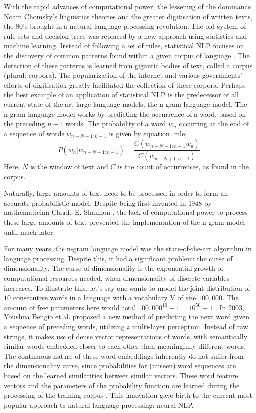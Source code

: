 \documentclass[twoside]{uva-inf-bachelor-thesis}
\begin{document}
With the rapid advances of computational power, the lessening of the dominance Noam Chomsky's linguistics theories and the greater digitisation of written texts, the 80's brought in a natural language processing revolution. The old system of rule sets and decision trees was replaced by a new approach using statistics and machine learning. Instead of following a set of rules, statistical NLP focuses on the discovery of common patterns found within a given corpus of language \cite{Manning99}. The detection of these patterns is learned from gigantic bodies of text, called a corpus (plural: corpora). The popularization of the internet and various governments' efforts of digitisation greatly facilitated the collection of these corpora. 
Perhaps the best example of an application of statistical NLP is the predecessor of all current state-of-the-art large language models, the n-gram language model. The n-gram language model works by predicting the occurrence of a word, based on the preceding $n-1$ words. The probability of a word $w_n$ occurring at the end of a sequence of words $w_{n-N+1 : n-1}$ is given by equation \ref{mle} \cite{brown92, Manning99}.
\begin{equation} \label{mle}
    P(w_{n} | w_{n-N+1 : n-1}) = \frac{C(w_{n-N+1 : n-1} w_{n})}{C(w_{n-N+1 : n-1})}
\end{equation}
Here, $N$ is the window of text and $C$ is the count of occurrences, as found in the corpus. 

Naturally, large amounts of text need to be processed in order to form an accurate probabilistic model. Despite being first invented in 1948 by mathematician Claude E. Shannon \cite{shannon48}, the lack of computational power to process these large amounts of text prevented the implementation of the n-gram model until much later.


For many years, the n-gram language model was the state-of-the-art algorithm in language processing. Despite this, it had a significant problem: the curse of dimensionality. The curse of dimensionality is the exponential growth of computational resources needed, when dimensionality of discrete variables increases. To illustrate this, let's say one wants to model the joint distribution of $10$ consecutive words in a language with a vocabulary V of size $100,000$. The amount of free parameters here would total $100,000^{10}-1 = 10^{50}-1$ \cite{bengio03}. 
In 2003, Youshua Bengio et al. proposed a new method of predicting the next word given a sequence of preceding words, utilizing a multi-layer perceptron. Instead of raw strings, it makes use of dense vector representations of words, with semantically similar words embedded closer to each other than meaningfully different words. The continuous nature of these word embeddings inherently do not suffer from the dimensionality curse, since probabilities for (unseen) word sequences are based on the learned similarities between similar vectors. These word feature vectors and the parameters of the probability function are learned during the processing of the training corpus \cite{bengio03}. This innovation gave birth to the current most popular approach to natural language processing: neural NLP.
\end{document}
